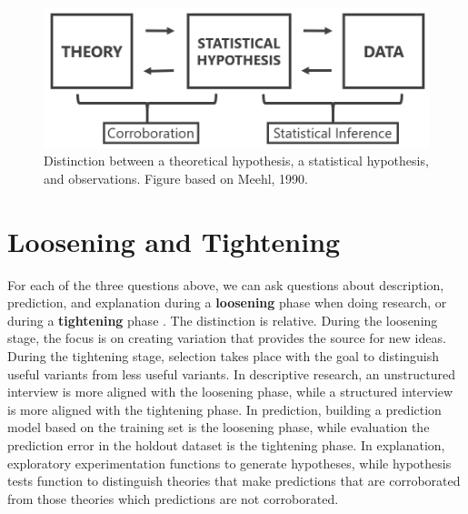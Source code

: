 \documentclass[
]{krantz}
\begin{document}
\begin{figure}

{\centering \includegraphics[width=1\linewidth]{images/meehl1990} 

}

\caption{Distinction between a theoretical hypothesis, a statistical hypothesis, and observations. Figure based on Meehl, 1990.}\label{fig:meehl1990}
\end{figure}

\hypertarget{loosening-and-tightening}{%
\section{Loosening and Tightening}\label{loosening-and-tightening}}

For each of the three questions above, we can ask questions about description, prediction, and explanation during a \textbf{loosening} phase when doing research, or during a \textbf{tightening} phase \citep{fiedler_tools_2004}. The distinction is relative. During the loosening stage, the focus is on creating variation that provides the source for new ideas. During the tightening stage, selection takes place with the goal to distinguish useful variants from less useful variants. In descriptive research, an unstructured interview is more aligned with the loosening phase, while a structured interview is more aligned with the tightening phase. In prediction, building a prediction model based on the training set is the loosening phase, while evaluation the prediction error in the holdout dataset is the tightening phase. In explanation, exploratory experimentation functions to generate hypotheses, while hypothesis tests function to distinguish theories that make predictions that are corroborated from those theories which predictions are not corroborated.
\end{document}
